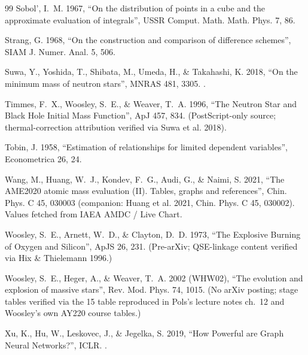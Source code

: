 \begin{thebibliography}{99}
Sobol', I.~M. 1967, ``On the distribution of points in a cube and the
approximate evaluation of integrals'', USSR Comput. Math. Math. Phys. 7, 86.

Strang, G. 1968, ``On the construction and comparison of difference schemes'',
SIAM J. Numer. Anal. 5, 506.

Suwa, Y., Yoshida, T., Shibata, M., Umeda, H., \& Takahashi, K. 2018, ``On the
minimum mass of neutron stars'', MNRAS 481, 3305. .

Timmes, F.~X., Woosley, S.~E., \& Weaver, T.~A. 1996, ``The Neutron Star and
Black Hole Initial Mass Function'', ApJ 457, 834. 
(PostScript-only source; thermal-correction attribution verified via Suwa et
al. 2018).

Tobin, J. 1958, ``Estimation of relationships for limited dependent
variables'', Econometrica 26, 24.

Wang, M., Huang, W.~J., Kondev, F.~G., Audi, G., \& Naimi, S. 2021, ``The
AME2020 atomic mass evaluation (II). Tables, graphs and references'', Chin.
Phys. C 45, 030003 (companion: Huang et al. 2021, Chin. Phys. C 45, 030002).
Values fetched from IAEA AMDC / Live Chart.

Woosley, S.~E., Arnett, W.~D., \& Clayton, D.~D. 1973, ``The Explosive Burning
of Oxygen and Silicon'', ApJS 26, 231. (Pre-arXiv; QSE-linkage content
verified via Hix \& Thielemann 1996.)

Woosley, S.~E., Heger, A., \& Weaver, T.~A. 2002 (WHW02), ``The evolution and
explosion of massive stars'', Rev. Mod. Phys. 74, 1015. (No arXiv posting;
stage tables verified via the 15 \Msun{} table reproduced in Pols's lecture
notes ch.~12 and Woosley's own AY220 course tables.)

Xu, K., Hu, W., Leskovec, J., \& Jegelka, S. 2019, ``How Powerful are Graph
Neural Networks?'', ICLR. .

\end{thebibliography}
\endgroup
